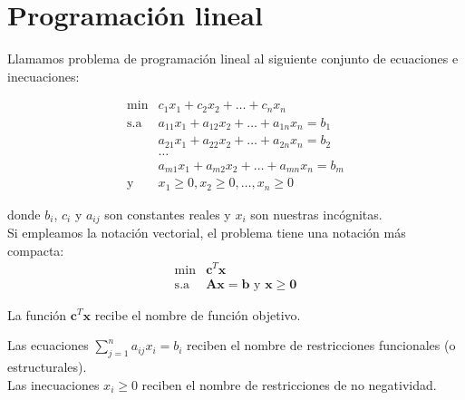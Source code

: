 \chapter{Programación lineal}

\begin{defi}
Llamamos problema de programación lineal al siguiente conjunto de ecuaciones e inecuaciones:

\begin{equation}\label{eq:lineal}
\begin{array}{rl}
\mathrm{min} & c_1x_1 + c_2x_2 + \dots + c_nx_n\\
\mathrm{s.a} & a_{11}x_1 + a_{12}x_2 + \dots + a_{1n}x_n = b_1\\
             & a_{21}x_1 + a_{22}x_2 + \dots + a_{2n}x_n = b_2\\
             & \dots                                          \\
             & a_{m1}x_1 + a_{m2}x_2 + \dots + a_{mn}x_n = b_m\\
\text{y}     & x_1 \geq 0, x_2 \geq 0, \dots, x_n \geq 0
\end{array}
\end{equation}

donde $b_i$, $c_i$ y $a_{ij}$ son constantes reales y $x_i$ son nuestras incógnitas.\\

Si empleamos la notación vectorial, el problema tiene una notación más compacta:\\

\begin{equation} \label{eq:forma_normal}
\begin{array}{rl}
\mathrm{min} & \mathbf{c}^T \mathbf{x}\\
\mathrm{s.a} & \mathbf{A x} = \mathbf{b} \text{ y } \mathbf{x} \geq \mathbf{0}
\end{array}
\end{equation} 

\end{defi}

\begin{defi}
La función $\mathbf{c}^T \mathbf{x}$ recibe el nombre de función objetivo.
\end{defi}

\begin{defi}
Las ecuaciones $\sum_{j=1}^{n} a_{ij}x_i = b_i$ reciben el nombre de restricciones funcionales (o estructurales).\\

Las inecuaciones $x_i \geq 0$ reciben el nombre de restricciones de no negatividad.
\end{defi}

